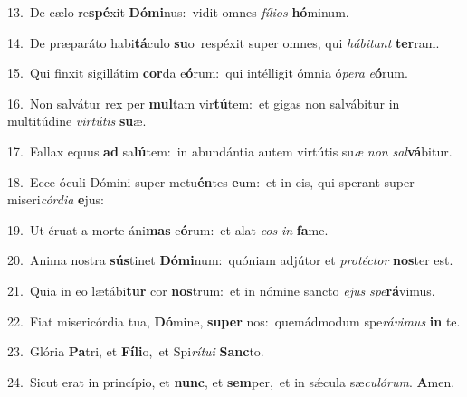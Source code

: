 {\numbfont\textcolor{\numbcolor}{13.}}~De cælo re\-\textbf{spé}\-xit \textbf{Dó}\-\textbf{mi}nus:~\star vidit omnes \textit{fí}\-\textit{li}\textit{os} \textbf{hó}\-minum.\par
{\numbfont\textcolor{\numbcolor}{14.}}~De præparáto habi\-\textbf{tá}\-culo \textbf{su}\-o~\star respéxit super omnes, qui \textit{há}\-\textit{bi}\textit{tant} \textbf{ter}\-ram.\par
{\numbfont\textcolor{\numbcolor}{15.}}~Qui finxit sigillátim \textbf{cor}\-da e\-\textbf{ó}\-rum:~\star qui intélligit ómnia ó\-\textit{pe}\-\textit{ra} \textit{e}\-\textbf{ó}rum.\par
{\numbfont\textcolor{\numbcolor}{16.}}~Non salvátur rex per \textbf{mul}\-tam vir\-\textbf{tú}\-tem:~\star et gigas non salvábitur in multitúdine \textit{vir}\-\textit{tú}\textit{tis} \textbf{su}\-æ.\par
{\numbfont\textcolor{\numbcolor}{17.}}~Fallax equus \textbf{ad} sa\-\textbf{lú}\-tem:~\star in abundántia autem virtútis su\textit{æ} \textit{non} \textit{sal}\-\textbf{vá}bitur.\par
{\numbfont\textcolor{\numbcolor}{18.}}~Ecce óculi Dómini super metu\-\textbf{én}\-tes \textbf{e}\-um:~\star et in eis, qui sperant super miseri\-\textit{cór}\-\textit{di}\textit{a} \textbf{e}\-jus:\par
{\numbfont\textcolor{\numbcolor}{19.}}~Ut éruat a morte áni\textbf{mas} e\-\textbf{ó}\-rum:~\star et alat \textit{e}\-\textit{os} \textit{in} \textbf{fa}\-me.\par
{\numbfont\textcolor{\numbcolor}{20.}}~Anima nostra \textbf{sús}\-tinet \textbf{Dó}\-\textbf{mi}num:~\star quóniam adjútor et \textit{pro}\-\textit{téc}\textit{tor} \textbf{nos}\-ter est.\par
{\numbfont\textcolor{\numbcolor}{21.}}~Quia in eo lætábi\textbf{tur} cor \textbf{nos}\-trum:~\star et in nómine sancto \textit{e}\-\textit{jus} \textit{spe}\-\textbf{rá}vimus.\par
{\numbfont\textcolor{\numbcolor}{22.}}~Fiat misericórdia tua, \textbf{Dó}\-mine, \textbf{su}\-\textbf{per} nos:~\star quemádmodum spe\-\textit{rá}\-\textit{vi}\textit{mus} \textbf{in} te.\par
{\numbfont\textcolor{\numbcolor}{23.}}~Glória \textbf{Pa}\-tri, et \textbf{Fí}\-\textbf{li}o,~\star et Spi\-\textit{rí}\-\textit{tu}\textit{i} \textbf{Sanc}\-to.\par
{\numbfont\textcolor{\numbcolor}{24.}}~Sicut erat in princípio, et \textbf{nunc}\-, et \textbf{sem}\-per,~\star et in sǽcula sæ\-\textit{cu}\-\textit{ló}\textit{rum}. \textbf{A}\-men.\par
